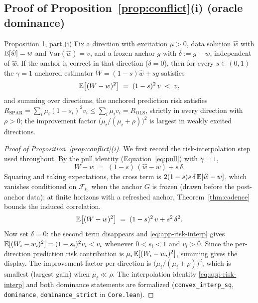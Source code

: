 \subsection{Proof of Proposition~\ref{prop:conflict}(i) (oracle dominance)}
\label{app:proof-dominance}

\begin{restated}{Proposition 1, part (i)}
Fix a direction with excitation $\mu > 0$, data solution $\widehat w$ with $\mathbb{E}[\widehat w] = w$ and $\mathrm{Var}(\widehat w) = v$, and a frozen anchor $g$ with $\delta := g - w$, independent of $\widehat w$.
If the anchor is correct in that direction ($\delta = 0$), then for every $s \in (0, 1)$ the $\gamma = 1$ anchored estimator $W = (1-s)\widehat w + s g$ satisfies
\[
  \mathbb{E}\bigl[(W - w)^2\bigr] \;=\; (1 - s)^2\,v \;<\; v,
\]
and summing over directions, the anchored prediction risk satisfies
$R_{\mathrm{SPAR}} = \sum_i \mu_i (1 - s_i)^2 v_i \le \sum_i \mu_i v_i = R_{\mathrm{OLS}}$,
strictly in every direction with $\rho > 0$; the improvement factor $\bigl(\mu_i/(\mu_i + \rho)\bigr)^2$ is largest in weakly excited directions.
\end{restated}

\begin{proof}[Proof of Proposition~\ref{prop:conflict}(i)]
We first record the risk-interpolation step used throughout.
By the pull identity (Equation~\eqref{eq:pull}) with $\gamma = 1$,
\[
  W - w \;=\; (1 - s)\,(\widehat w - w) + s\,\delta .
\]
Squaring and taking expectations, the cross term is $2(1-s)s\,\delta\,\mathbb{E}[\widehat w - w]$, which vanishes conditioned on $\mathcal F_{t_0}$ when the anchor $G$ is frozen (drawn before the post-anchor data); at finite horizons with a refreshed anchor, Theorem~\ref{thm:cadence} bounds the induced correlation.
\begin{equation}
\label{eq:app-risk-interp}
  \mathbb{E}\bigl[(W - w)^2\bigr] \;=\; (1 - s)^2\,v + s^2\,\delta^2 .
\end{equation}
Now set $\delta = 0$: the second term disappears and \eqref{eq:app-risk-interp} gives $\mathbb{E}[(W_i - w_i)^2] = (1 - s_i)^2 v_i < v_i$ whenever $0 < s_i < 1$ and $v_i > 0$.
Since the per-direction prediction risk contribution is $\mu_i\,\mathbb{E}[(W_i - w_i)^2]$, summing gives the display.
The improvement factor per direction is $\bigl(\mu_i/(\mu_i + \rho)\bigr)^2$, which is smallest (largest gain) when $\mu_i \ll \rho$.
The interpolation identity \eqref{eq:app-risk-interp} and both dominance statements are formalized (\texttt{convex\_interp\_sq}, \texttt{dominance}, \texttt{dominance\_strict} in \texttt{Core.lean}).
\end{proof}

